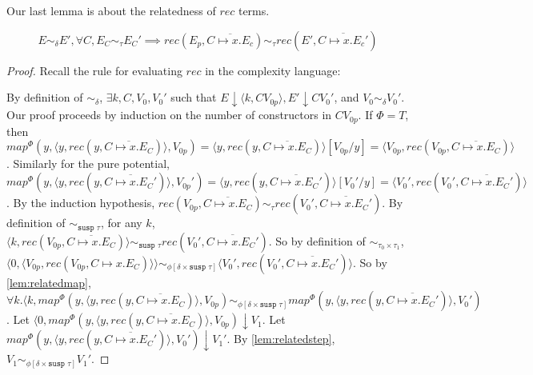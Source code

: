 Our last lemma is about the relatedness of $rec$ terms.
\begin{lemma}
  \label{lem:relatedrec}
  \[ E \sim_\delta E', \forall C, E_C \sim_\tau E_C' \implies rec(E_p, \overline{C \mapsto x.E_c}) \sim_\tau rec(E', \overline{C \mapsto x.E_c'}) \]
\end{lemma}
\begin{proof}
  Recall the rule for evaluating $rec$ in the complexity language:
  \begin{prooftree}
  \end{prooftree}
  By definition of $\sim_\delta$, $\exists k, C, V_0, V_0'$ such that $E \downarrow \langle k, C V_{0p} \rangle, E' \downarrow C V_0'$, and $V_0 \sim_\delta V_0'$.
  Our proof proceeds by induction on the number of constructors in $C V_{0p}$.
  If $\Phi = T$, then $map^\Phi(y, \langle y, rec(y, \overline{C \mapsto x.E_C})\rangle, V_{0p}) = \langle y, rec(y, \overline{C \mapsto x.E_C})\rangle[V_{0p}/y] = \langle V_{0p}, rec(V_{0p}, \overline{C \mapsto x.E_C}) \rangle$.
  Similarly for the pure potential, $map^\Phi(y, \langle y, rec(y, \overline{C \mapsto x.E_C'})\rangle, V_{0p}') = \langle y, rec(y, \overline{C \mapsto x.E_C'})\rangle [V_0'/y] = \langle V_0', rec(V_0', \overline{C \mapsto x.E_C'}) \rangle$.
  By the induction hypothesis, $rec(V_{0p}, \overline{C \mapsto x.E_C}) \sim_\tau rec(V_0', \overline{C \mapsto x.E_C'})$.
  By definition of $\sim_{\texttt{susp }\tau}$, for any $k$, $\langle k, rec(V_{0p}, \overline{C \mapsto x.E_C}) \rangle \sim_{\texttt{susp }\tau} rec(V_0', \overline{C \mapsto x.E_C'})$.
  So by definition of $\sim_{\tau_0 \times \tau_1}$, $\langle 0, \langle V_{0p}, rec(V_{0p}, C \mapsto x.E_C) \rangle\rangle \sim_{\phi[\delta \times \texttt{susp }\tau]} \langle V_0', rec(V_0', \overline{C \mapsto x.E_C'})\rangle$.
  So by \ref{lem:relatedmap}, $\forall k. \langle k, map^\Phi(y, \langle y, rec(y, \overline{C \mapsto x.E_C})\rangle, V_{0p}) \sim_{\phi[\delta \times \texttt{susp }\tau]} map^\Phi(y, \langle y, rec(y, \overline{C \mapsto x.E_C'}) \rangle, V_0')$.
  Let $\langle 0, map^\Phi(y, \langle y, rec(y, \overline{C \mapsto x.E_C})\rangle, V_{0p}) \downarrow V_1$.
  Let $map^\Phi(y, \langle y, rec(y, \overline{C \mapsto x.E_C'}) \rangle, V_0') \downarrow V_1'$.
  By \ref{lem:relatedstep}, $V_1 \sim_{\phi[\delta \times \texttt{susp }\tau]} V_1'$.


\end{proof}

